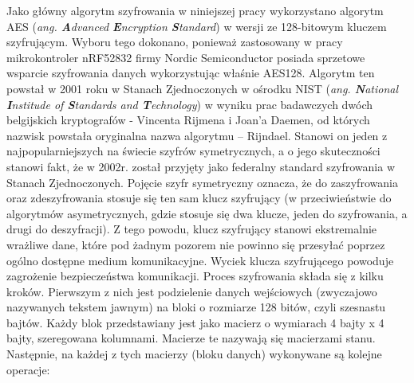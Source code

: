 Jako główny algorytm szyfrowania w niniejszej pracy wykorzystano algorytm AES \linebreak (\textit{ang. \textbf{A}dvanced \textbf{E}ncryption \textbf{S}tandard}) w wersji ze 128-bitowym kluczem szyfrującym.  Wyboru tego dokonano, ponieważ zastosowany w pracy mikrokontroler nRF52832 firmy Nordic Semiconductor posiada sprzetowe wsparcie szyfrowania danych wykorzystując właśnie AES128. Algorytm ten powstał w 2001 roku w Stanach Zjednoczonych w ośrodku NIST \linebreak (\textit{ang. \textbf{N}ational \textbf{I}nstitude of \textbf{S}tandards and \textbf{T}echnology}) w wyniku prac badawczych dwóch belgijskich kryptografów - Vincenta Rijmena i Joan’a Daemen, od których nazwisk powstała oryginalna nazwa algorytmu – Rijndael. Stanowi on jeden z najpopularniejszych na świecie szyfrów symetrycznych, a o jego skuteczności stanowi fakt, że w 2002r. został przyjęty jako federalny standard szyfrowania w Stanach Zjednoczonych. Pojęcie szyfr symetryczny oznacza, że do zaszyfrowania oraz zdeszyfrowania stosuje się ten sam klucz szyfrujący (w przeciwieństwie do algorytmów asymetrycznych, gdzie stosuje się dwa klucze, jeden do szyfrowania, a drugi do deszyfracji). Z tego powodu, klucz szyfrujący stanowi ekstremalnie wrażliwe dane, które pod żadnym pozorem nie powinno się przesyłać poprzez ogólno dostępne medium komunikacyjne. Wyciek klucza szyfrującego powoduje zagrożenie bezpieczeństwa komunikacji.
Proces szyfrowania składa się z kilku kroków. Pierwszym z nich jest podzielenie danych wejściowych (zwyczajowo nazywanych tekstem jawnym) na bloki o rozmiarze 128 bitów, czyli szesnastu bajtów. Każdy blok przedstawiany jest jako macierz o wymiarach 4 bajty x 4 bajty, szeregowana kolumnami. Macierze te nazywają się macierzami stanu. Następnie, na każdej z tych macierzy (bloku danych) wykonywane są kolejne operacje:

